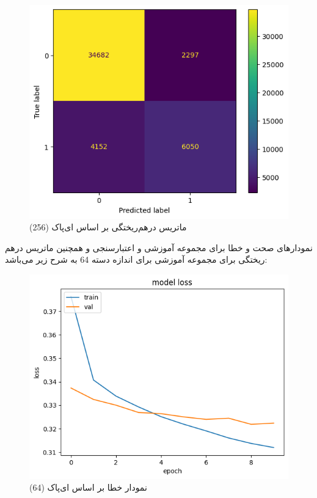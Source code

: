 \documentclass{article}
\begin{document}
\begin{figure}[!h]
    \centering\includegraphics[scale=.55]{./p5-3}
    \caption{ماتریس درهم‌ریختگی بر اساس ای‌پاک (256)}\label{fig.53}
\end{figure}

\cleardoublepage

نمودارهای صحت و خطا برای مجموعه آموزشی و اعتبارسنجی و همچنین ماتریس درهم ریختگی برای مجموعه آموزشی برای اندازه دسته 64  به شرح زیر می‌باشد:

\begin{figure}[!h]
    \centering\includegraphics[scale=.55]{./p5-4}
    \caption{نمودار خطا بر اساس ای‌پاک (64)}\label{fig.54}
\end{figure}
\end{document}
